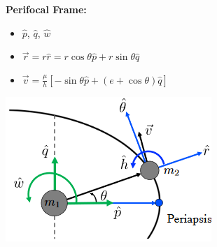 \documentclass{article}
\begin{document}
\begin{multicols*}{3}
    \textbf{Perifocal Frame:}  
    \begin{itemize}
        \itemsep0em
        \item $\hat{p}$, $\hat{q}$, $\hat{w}$
        \item $\vec{r} = r\hat{r} = r\cos{\theta}\hat{p} + r\sin{\theta}\hat{q}$
        \item $\vec{v} = \frac{\mu}{h}[-\sin{\theta}\hat{p}+(e+\cos{\theta})\hat{q}]$
    \end{itemize}
    \includegraphics[width=0.5\linewidth]{Figures/perifocal_plane.png}
    

\end{multicols*}
\end{document}

